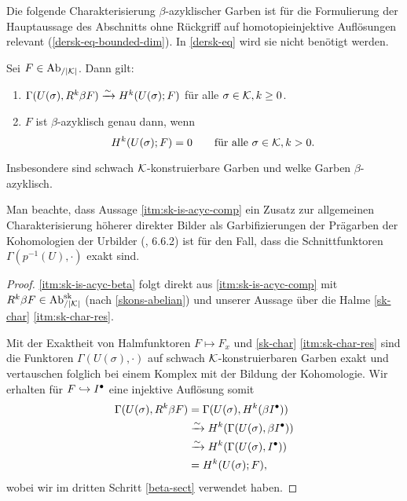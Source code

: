Die folgende Charakterisierung $\beta$-azyklischer Garben ist für die
Formulierung der Hauptaussage des Abschnitts ohne Rückgriff auf
homotopieinjektive Auflösungen relevant
(\ref{dersk-eq-bounded-dim}). In \ref{dersk-eq} wird sie nicht
benötigt werden.
\begin{prop}[\cite{KS}, 8.1.8] \label{sk-is-acyc}
  Sei $F \in \operatorname{Ab}_{/|\mathcal{K}|}$. Dann gilt:
  \begin{enumerate}[label=(\roman*)]
  \item \label{itm:sk-is-acyc-comp} $\Gamma(U(\sigma), R^k\beta F)
    \xrightarrow[]{\sim} H^k(U(\sigma); F)$ für alle $\sigma \in \mathcal{K}, k \geq 0$.
  \item \label{itm:sk-is-acyc-beta} $F$ ist $\beta$-azyklisch genau dann,
    wenn
    \[ H^k(U(\sigma); F) = 0 \qquad \text{für alle } \sigma \in \mathcal{K}, k > 0 . \]
  \end{enumerate}
  Insbesondere sind schwach $\mathcal{K}$-konstruierbare Garben und welke
  Garben $\beta$-azyklisch.
\end{prop}
\begin{bem}
  Man beachte, dass Aussage \ref{itm:sk-is-acyc-comp} ein Zusatz zur
  allgemeinen Charakterisierung höherer direkter Bilder als
  Garbifizierungen der Prägarben der Kohomologien der Urbilder
  (\cite{TG}, 6.6.2) ist für den Fall, dass die Schnittfunktoren
  $\Gamma(p^{-1}(U), \cdot)$ exakt sind.
\end{bem}
\begin{proof}
  \ref{itm:sk-is-acyc-beta} folgt direkt aus \ref{itm:sk-is-acyc-comp}
  mit $R^k\beta F \in \operatorname{Ab}_{/|\mathcal{K}|}^{\operatorname{sk}}$ (nach \ref{skons-abelian}) und unserer
  Aussage über die Halme \ref{sk-char} \ref{itm:sk-char-res}.
  
  Mit der Exaktheit von Halmfunktoren $F \mapsto F_x$ und
  \ref{sk-char} \ref{itm:sk-char-res} sind die Funktoren
  $\Gamma(U(\sigma), \cdot)$ auf schwach $\mathcal{K}$-konstruierbaren Garben
  exakt und vertauschen folglich bei einem Komplex mit der Bildung der
  Kohomologie. Wir erhalten für $F \hookrightarrow I^{\bullet}$ eine injektive Auflösung
  somit
  \begin{align*}
    \Gamma(U(\sigma), R^k\beta F)
    &= \Gamma(U(\sigma), H^k(\beta I^{\bullet})) \\
    &\xrightarrow[]{\sim} H^k(\Gamma(U(\sigma), \beta I^{\bullet})) \\
    &\xrightarrow[]{\sim} H^k(\Gamma(U(\sigma), I^{\bullet})) \\
    &= H^k(U(\sigma); F),
  \end{align*}
  wobei wir im dritten Schritt \ref{beta-sect} verwendet haben.
\end{proof}

